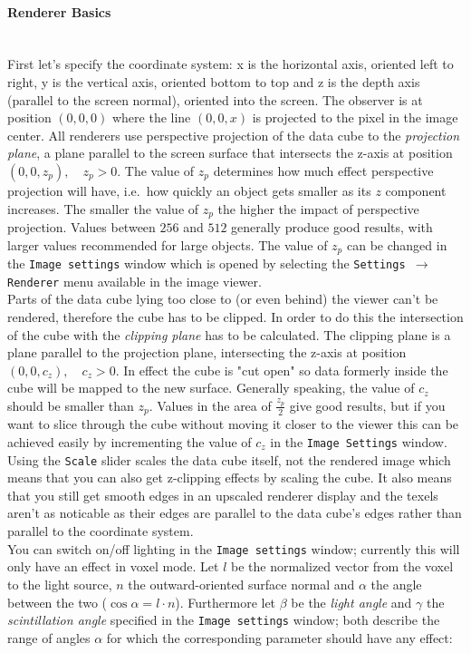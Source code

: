 \documentclass[11pt]{article}
\begin{document}
\paragraph{Renderer Basics} \label{RendererModel}	%
\ \\
First let's specify the coordinate system: x is the
horizontal axis, oriented left to right, y is the vertical axis, oriented bottom to
top and z is the depth axis (parallel to the screen normal), oriented into the screen.
The observer is at position $(0, 0, 0)$ where the line $(0, 0, x)$ is projected to
the pixel in the image center. All renderers use perspective projection of
the data cube to the \emph{projection plane}, a plane parallel to the screen surface
that intersects the z-axis at position $(0, 0, z_p), \quad z_p > 0$. The value of $z_p$
determines how much effect perspective projection will have, i.e.\ how quickly an object
gets smaller as its $z$ component increases. The smaller the value of $z_p$
the higher the impact of perspective projection. Values between $256$ and $512$
generally produce good results, with larger values recommended for large objects.
The value of $z_p$ can be changed in the \texttt{Image settings} window which is
opened by selecting the \texttt{Settings $\rightarrow$ Renderer} menu available
in the image viewer.\\
Parts of the data cube lying too close to (or even behind) the viewer can't be
rendered, therefore the cube has to be clipped. In order to do this the intersection
of the cube with the \emph{clipping plane} has to be calculated. The clipping plane
is a plane parallel to the projection plane, intersecting the z-axis at position
$(0, 0, c_z), \quad c_z > 0$. In effect the cube is "cut open" so data formerly inside the
cube will be mapped to the new surface. Generally speaking, the value of $c_z$ should
be smaller than $z_p$. Values in the area of $\frac{z_p}{2}$ give good results, but
if you want to slice through the cube without moving it closer to the viewer this
can be achieved easily by incrementing the value of $c_z$ in the \texttt{Image
Settings} window.\\
Using the \texttt{Scale} slider scales the data cube itself, not the rendered
image which means that you can also get z-clipping effects by scaling the
cube. It also means that you still get smooth edges in an upscaled renderer
display and the texels aren't as noticable as their edges are parallel
to the data cube's edges rather than parallel to the coordinate system.\\
You can switch on/off lighting in the \texttt{Image settings} window; currently
this will only have an effect in voxel mode. Let $l$ be the normalized vector
from the voxel to the light source, $n$ the outward-oriented surface normal and
$\alpha$ the angle between the two ($\cos\alpha = l \cdot n$). Furthermore let
$\beta$ be the \emph{light angle} and $\gamma$ the \emph{scintillation angle}
specified in the \texttt{Image settings} window; both describe the range of angles
$\alpha$ for which the corresponding parameter should have any effect:
\end{document}
